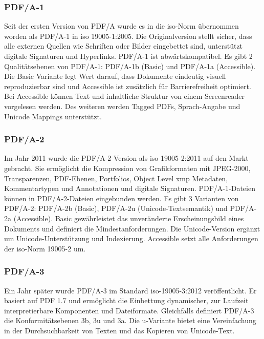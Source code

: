 \subsubsection{PDF/A-1}
Seit der ersten Version von PDF/A wurde es in die \gls{iso}-Norm übernommen worden als PDF/A-1 in \gls{iso} 19005-1:2005. \cite{proj-consult} Die Originalversion stellt sicher, dass alle externen Quellen wie Schriften oder Bilder eingebettet sind, unterstützt digitale Signaturen und Hyperlinks. PDF/A-1 ist abwärtskompatibel. Es gibt 2 Qualitätsebenen von PDF/A-1: PDF/A-1b (Basic) und PDF/A-1a (Accessible). Die Basic Variante legt Wert darauf, dass Dokumente eindeutig visuell reproduzierbar sind und Accessible ist zusätzlich für Barrierefreiheit optimiert. Bei Accessible können Text und inhaltliche Struktur von einem Screenreader vorgelesen werden. \cite{adobe-pdf-a} Des weiteren werden Tagged PDFs, Sprach-Angabe und Unicode Mappings unterstützt. \cite{proj-consult}

\subsubsection{PDF/A-2}
Im Jahr 2011 wurde die PDF/A-2 Version als \gls{iso} 19005-2:2011 auf den Markt gebracht. Sie ermöglicht die Kompression von Grafikformaten mit JPEG-2000, Transparenzen, PDF-Ebenen, Portfolios, Object Level \gls{xmp} Metadaten, Kommentartypen und Annotationen und digitale Signaturen. \cite{proj-consult} PDF/A-1-Dateien können in PDF/A-2-Dateien eingebunden werden. Es gibt 3 Varianten von PDF/A-2: PDF/A-2b (Basic), PDF/A-2u (Unicode-Textsemantik) und PDF/A-2a (Accessible). Basic gewährleistet das unveränderte Erscheinungsbild eines Dokuments und definiert die Mindestanforderungen. Die Unicode-Version ergänzt um Unicode-Unterstützung und Indexierung. Accessible setzt alle Anforderungen der \gls{iso}-Norm 19005-2 um. \cite{adobe-pdf-a}

\subsubsection{PDF/A-3}
Ein Jahr später wurde PDF/A-3 im Standard \gls{iso}-19005-3:2012 veröffentlicht. Er basiert auf PDF 1.7 und ermöglicht die Einbettung dynamischer, zur Laufzeit interpretierbare Komponenten und Dateiformate. Gleichfalls definiert PDF/A-3 die Konformitätsebenen 3b, 3u und 3a. Die u-Variante bietet eine Vereinfachung in der Durchsuchbarkeit von Texten und das Kopieren von Unicode-Text. \cite{proj-consult}

